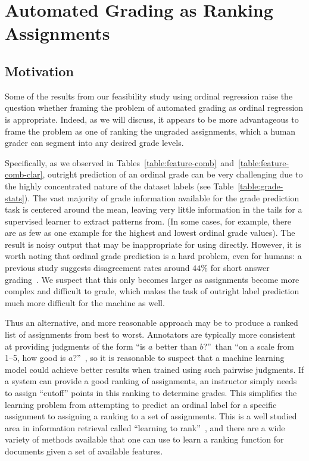 
\section{Automated Grading as Ranking Assignments}

\subsection{Motivation}

Some of the results from our feasibility study using ordinal regression raise
 the question whether framing the problem of automated grading as
ordinal regression is appropriate. Indeed, as we will discuss, it appears
to be more advantageous to frame the problem as one of ranking
the ungraded assignments, which a human grader can segment  into
any desired grade levels. 

Specifically, as we observed in
Tables~\ref{table:feature-comb}~and~\ref{table:feature-comb-clar}, outright
prediction of an ordinal grade can be very challenging due to the highly
concentrated nature of the dataset labels (see
Table~\ref{table:grade-stats}). The vast majority of grade information
available for the grade prediction task is centered around the mean,
leaving very little information in the tails for a supervised learner to
extract patterns from. (In some cases, for example, there are as few as one
example for the highest and lowest ordinal grade values). The result is
noisy output that may be inappropriate for using directly. However, it is
worth noting that ordinal grade prediction is a hard problem, even for
humans: a previous study suggests disagreement rates around $44\%$ for
short answer grading~\cite{Mohler:2009:EACL}. We suspect that this only
becomes larger as assignments become more complex and difficult to grade,
which makes the task of outright label prediction much more difficult for
the machine as well.

Thus  an alternative, and more reasonable approach may be to produce a ranked list of
assignments from best to worst. Annotators are typically more consistent at
providing judgments of the form ``is $a$ better than $b$?''\ than ``on a
scale from 1--5, how good is $a$?''~\cite{Callison-Burch:2007:WMT}, so it
is reasonable to suspect that a machine learning model could achieve better
results when trained using such pairwise judgments. If a system can provide
a good ranking of assignments, an instructor simply needs to assign
``cutoff'' points in this ranking to determine grades. This simplifies the
learning problem from attempting to predict an ordinal label for a specific
assignment to assigning a ranking to a set of assignments. This is a well
studied area in information retrieval called ``learning to
rank''~\cite{Joachims:2002:KDD, Liu:2009}, and there are a wide variety of methods
available that one can use to learn a ranking function for documents given
a set of available features.  

